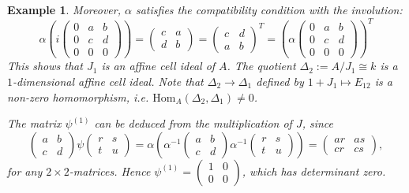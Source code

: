 \documentclass[oneside, a4paper, 11pt]{amsart}
\newtheorem{example}[theorem]{Example}
\newcommand{\RR}{\mathbb{R}}
\begin{document}
\begin{example}
Moreover, $\alpha$ satisfies the compatibility condition with the involution:
$$\alpha \left( 
i\left( \begin{array}{ccc}
0 & a & b \\ 0 & c & d \\ 0 & 0 & 0
\end{array}\right)\right)
 = \left( 
\begin{array}{cc}
c & a \\  d & b 
\end{array}\right)
= \left( 
\begin{array}{cc}
c & d \\  a & b 
\end{array}\right)^T
= \left(\alpha \left( \begin{array}{ccc}
0 & a & b \\ 0 & c & d \\ 0 & 0 & 0
\end{array}\right)\right)^T
$$
This shows that $J_1$ is an affine cell ideal of $A$. The quotient $\Delta_2:=A/J_1\cong k$ is a $1$-dimensional affine cell ideal. Note that $\Delta_2 \to \Delta_1$ defined by $1+J_1 \mapsto E_{12}$ is a non-zero homomorphism, i.e. $\mathrm{Hom}_{A}(\Delta_2, \Delta_1)\neq 0$.

The  matrix $\psi^{(1)}$ can be deduced from the multiplication of $J$, since
$$\left(
\begin{array}{cc}
a & b \\  c & d
\end{array}
\right)
\psi 
\left(
\begin{array}{cc}
r & s \\  t & u
\end{array}
\right) = 
\alpha\left(
\alpha^{-1}\left(
\begin{array}{cc}
a & b \\  c & d
\end{array}
\right)
\alpha^{-1}\left(
\begin{array}{cc}
r & s \\  t & u
\end{array}
\right) \right)
=\left(
 \begin{array}{cc}
ar & as \\  cr & cs
\end{array}
\right),$$
for any $2\times 2$-matrices. Hence $\psi^ {(1)}=\left(
\begin{array}{cc}
1 & 0 \\  0 & 0
\end{array}
\right)$, which has determinant zero.
\end{example}
\end{document}
